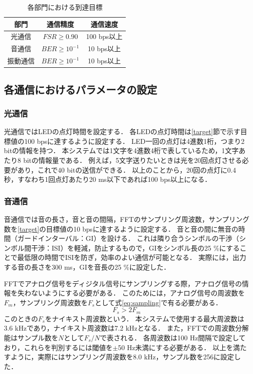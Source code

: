 \begin{table}[ht]
    \centering
    \caption{各部門における到達目標}
    \label{table:sihyo}
    \begin{tabular}{|c|c|c|} \hline
        部門 &通信精度  &通信速度  \\ \hline
        光通信 &$FSR \geq 0.90$ &100 bps以上 \\ \hline
        音通信 &$BER \geq 10^{-1}$ &10 bps以上 \\ \hline
        振動通信 &$BER \geq 10^{-1}$ &10 bps以上 \\ \hline
    \end{tabular}
\end{table}


\subsection{各通信におけるパラメータの設定}
\subsubsection{光通信}
光通信ではLEDの点灯時間を設定する．
各LEDの点灯時間は\ref{target}節で示す目標値の100 bpsに達するように設定する．
LED一回の点灯は4進数1桁，つまり2 bitの情報を持つ．
本システムでは1文字を4進数4桁で表しているため，1文字あたり8 bitの情報量である．
例えば，5文字送りたいときは光を20回点灯させる必要があり，これで40 bitの送信ができる．
以上のことから，20回の点灯に0.4秒，すなわち1回点灯あたり20 ms以下であれば100 bps以上になる．

\subsubsection{音通信}
音通信では音の長さ，音と音の間隔，FFTのサンプリング周波数，サンプリング数を\ref{target}の目標値の10 bpsに達するように設定する．
音と音の間に無音の時間（ガードインターバル：GI）を設ける．
これは隣り合うシンボルの干渉（シンボル間干渉：ISI）を軽減，防止するもので，GIをシンボル長の25 \%にすることで最低限の時間でISIを防ぎ，効率のよい通信が可能となる\cite{ref:gi}．
実際には，出力する音の長さを300 ms，GIを音長の25 \%に設定した．
\par 
FFTでアナログ信号をディジタル信号にサンプリングする際，アナログ信号の情報を失わないようにする必要がある\cite{ref:digital}．
このためには，アナログ信号の周波数を$F_m$，サンプリング周波数を$F_s$として式\ref{eq:sampling}で有る必要がある．
\begin{equation}
    \label{eq:sampling}
    F_s > 2F_m
\end{equation}
このときの$F_s$をナイキスト周波数という．
本システムで使用する最大周波数は3.6 kHzであり，ナイキスト周波数は7.2 kHzとなる．
また，FFTでの周波数分解能はサンプル数を$N$として$F_s / N$で表される．
各周波数は100 Hz間隔で設定しており，これらを判別するには閾値を$\pm$50 Hz未満にする必要がある．
以上を満たすように，実際にはサンプリング周波数を8.0 kHz，サンプル数を256に設定した．

